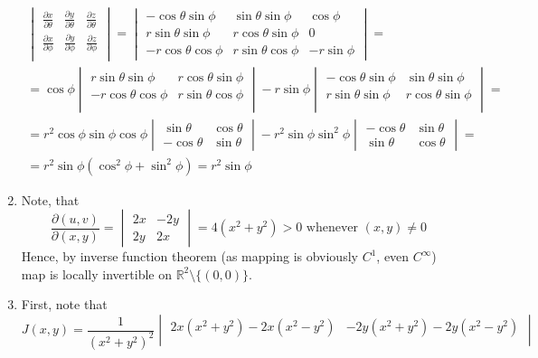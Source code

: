 \documentclass[8pt]{article} %
\begin{document}
\begin{enumerate}
{\begin{enumerate}[label=(\alph*)]
{\begin{gather*}
\begin{vmatrix}
					\frac{\partial x}{\partial\theta}&\frac{\partial y}{\partial\theta}&\frac{\partial z}{\partial\theta}\\
					\frac{\partial x}{\partial\phi}&\frac{\partial y}{\partial\phi}&\frac{\partial z}{\partial\phi}\\
				\end{vmatrix}=
				\begin{vmatrix}
					-\cos\theta\sin\phi&\sin\theta\sin\phi&\cos\phi\\
					r\sin\theta\sin\phi&r\cos\theta\sin\phi&0\\
					-r\cos\theta\cos\phi & r\sin\theta\cos\phi&-r\sin\phi
				\end{vmatrix}=\\
				=\cos\phi\begin{vmatrix}
					r\sin\theta\sin\phi&r\cos\theta\sin\phi\\
					-r\cos\theta\cos\phi&r\sin\theta\cos\phi\\
				\end{vmatrix}-r\sin\phi\begin{vmatrix}
				-\cos\theta\sin\phi&\sin\theta\sin\phi\\
				r\sin\theta\sin\phi&r\cos\theta\sin\phi\\
				\end{vmatrix}=\\
				=r^2\cos\phi\sin\phi\cos\phi\begin{vmatrix}\sin\theta&\cos\theta\\-\cos\theta&\sin\theta\end{vmatrix}-
				r^2\sin\phi\sin^2\phi\begin{vmatrix}-\cos\theta&\sin\theta\\\sin\theta&\cos\theta\end{vmatrix}=\\
				=r^2\sin\phi(\cos^2\phi+\sin^2\phi)=r^2\sin\phi
			\end{gather*}
				}
		\end{enumerate}
		}
	\item{Note, that \[\frac{\partial(u,v)}{\partial(x,y)}=\begin{vmatrix}2x&-2y\\2y&2x\end{vmatrix}=4(x^2+y^2)>0\text{ whenever } (x,y)\neq 0\]
			Hence, by inverse function theorem (as mapping is obviously $C^1$, even $C^{\infty}$) map is locally invertible on $\mathbb{R}^2\setminus\{(0,0)\}$.
			}
		\item{First, note that \[J(x,y)=\frac{1}{(x^2+y^2)^2}\begin{vmatrix}2x(x^2+y^2)-2x(x^2-y^2)&-2y(x^2+y^2)-2y(x^2-y^2)\\

\end{vmatrix}\]}
\end{enumerate}
\end{document}
